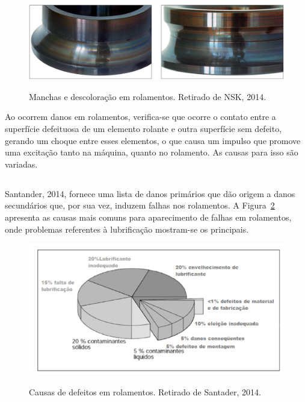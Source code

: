 \documentclass[
	12pt,				
	oneside,			
	a4paper,			
	english,			
	brazil,			
	]{abntex2ppgsi}
\begin{document}
\begin{figure}[H]
\centering
\caption {Manchas e descoloração em rolamentos. Retirado de NSK, 2014.}
\includegraphics[width=\textwidth,height=\textheight,keepaspectratio]{manchas_nsk}
\label{manchas_nsk}
\end{figure}

Ao ocorrem danos em rolamentos, verifica-se que ocorre o contato entre a superfície defeituosa de um elemento rolante e outra superfície sem defeito, gerando um choque entre esses elementos, o que causa um impulso que promove uma excitação tanto na máquina, quanto no rolamento. As causas para isso são variadas.

\subsection{}

Santander, 2014, fornece uma lista de danos primários que dão origem a danos secundários que, por sua vez, induzem falhas nos rolamentos. A Figura~\ref{falhas_comuns_rolamentos} apresenta as causas mais comuns para aparecimento de falhas em rolamentos, onde problemas referentes à lubrificação mostram-se os principais.

\begin{figure}[H]
\centering
\caption {Causas de defeitos em rolamentos. Retirado de Santader, 2014.}
\includegraphics[width=\textwidth,height=\textheight,keepaspectratio]{falhas_comuns_rolamentos}
\label{falhas_comuns_rolamentos}
\end{figure}
\end{document}

